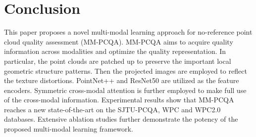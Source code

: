 \documentclass{article}
\begin{document}
\section{Conclusion}
This paper proposes a novel multi-modal learning approach for no-reference point cloud quality assessment (MM-PCQA). MM-PCQA aims to acquire quality information across modalities and optimize the quality representation. In particular, the point clouds are patched up to preserve the important local geometric structure patterns. Then the projected images are employed to reflect the texture distortions. PointNet++ and ResNet50 are utilized as the feature encoders. Symmetric cross-modal attention is further employed to make full use of the cross-modal information.  Experimental results show that MM-PCQA reaches a new state-of-the-art on the SJTU-PCQA, WPC and WPC2.0 databases. Extensive ablation studies further demonstrate the potency of the proposed multi-modal learning framework. 
\end{document}
